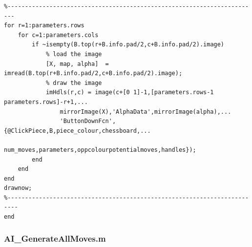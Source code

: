 \documentclass[11pt,a4paper]{article}
\begin{document}
\begin{lstlisting}
%------------------------------------------------------------------------
for r=1:parameters.rows
    for c=1:parameters.cols
        if ~isempty(B.top(r+B.info.pad/2,c+B.info.pad/2).image)
            % load the image
            [X, map, alpha]  = imread(B.top(r+B.info.pad/2,c+B.info.pad/2).image);
            % draw the image
            imHdls(r,c) = image(c+[0 1]-1,[parameters.rows-1 parameters.rows]-r+1,...
                mirrorImage(X),'AlphaData',mirrorImage(alpha),...
                'ButtonDownFcn',{@ClickPiece,B,piece_colour,chessboard,...
                num_moves,parameters,oppcolourpotentialmoves,handles});
        end
    end
end
drawnow;
%-------------------------------------------------------------------------
end
\end{lstlisting}

\subsubsection{AI\_GenerateAllMoves.m}
\end{document}
